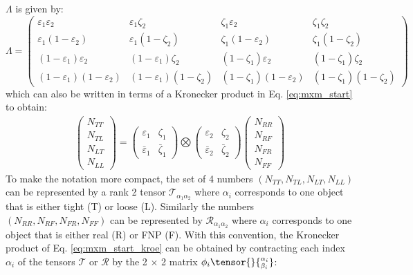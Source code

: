 $\Lambda$ is given by:
\[
\Lambda=
\left(\begin{array}{cccc}
\varepsilon_1\varepsilon_2 & \varepsilon_1\zeta_2 & \zeta_1\varepsilon_2 & \zeta_1\zeta_2\\
\varepsilon_1(1-\varepsilon_2) & \varepsilon_1(1-\zeta_2) & \zeta_1(1-\varepsilon_2) & \zeta_1(1-\zeta_2)\\
(1-\varepsilon_1)\varepsilon_2 & (1-\varepsilon_1)\zeta_2 & (1-\zeta_1)\varepsilon_2 & (1-\zeta_1)\zeta_2\\
(1-\varepsilon_1)(1-\varepsilon_2) & (1-\varepsilon_1)(1-\zeta_2) & (1-\zeta_1)(1-\varepsilon_2) & (1-\zeta_1)(1-\zeta_2)
\end{array}\right) 
\]
which can also be written in terms of a Kronecker product in 
Eq. \ref{eq:mxm_start} to obtain:
\begin{align}
\left(\begin{array}{c}
N_{TT} \\  N_{TL} \\ N_{LT} \\ N_{LL}
\end{array}\right)
= \begin{pmatrix}\varepsilon_1 & \zeta_1\\ \bar\varepsilon_1 & \bar\zeta_1\end{pmatrix} \bigotimes \begin{pmatrix}\varepsilon_2 & \zeta_2\\ \bar\varepsilon_2 & \bar\zeta_2\end{pmatrix}
\left(\begin{array}{c}
N_{RR} \\  N_{RF} \\ N_{FR} \\ N_{FF}
\end{array}\right)
\label{eq:mxm_start_kroe}
\end{align}
To make the notation more compact, the set of 4 numbers $(N_{TT},N_{TL},N_{LT},N_{LL})$ can be represented by a rank 2 tensor $\mathcal{T}_{\alpha_1 \alpha_2}$ 
where $\alpha_i$ corresponds to one object that is either tight (T) or 
loose (L). 
Similarly the numbers $(N_{RR},N_{RF},N_{FR},N_{FF})$ can be represented 
by $\mathcal{R}_{\alpha_1 \alpha_2}$ where $\alpha_i$ corresponds to one object 
that is either real (R) or FNP (F). With this convention, the 
Kronecker product of Eq. \ref{eq:mxm_start_kroe} can be obtained by 
contracting each index $\alpha_i$ of the tensors $\mathcal{T}$ or $\mathcal{R}$
by the 2 $\times$ 2 matrix $\phi_i\tensor{\vphantom{\phi}}{_{\beta_i}^{\alpha_i}}$:


